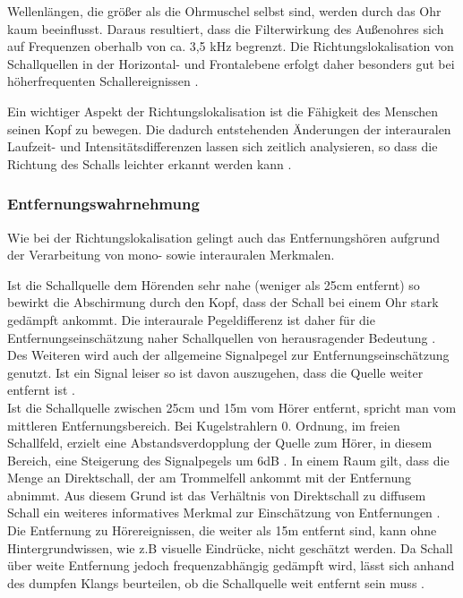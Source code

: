 Wellenlängen, die größer als die Ohrmuschel selbst sind, werden durch das Ohr kaum beeinflusst. Daraus resultiert, dass die Filterwirkung des Außenohres sich auf Frequenzen oberhalb von ca. 3,5 kHz begrenzt. Die Richtungslokalisation von Schallquellen in der Horizontal- und Frontalebene erfolgt daher besonders gut bei höherfrequenten Schallereignissen \cite[S.47]{Genuit10}.

Ein wichtiger Aspekt der Richtungslokalisation ist die Fähigkeit des Menschen seinen Kopf zu bewegen. Die dadurch entstehenden Änderungen der interauralen Laufzeit- und Intensitätsdifferenzen lassen sich zeitlich analysieren, so dass die Richtung des Schalls leichter erkannt werden kann \cite[S.88]{HdA08}.

\subsubsection{Entfernungswahrnehmung}

Wie bei der Richtungslokalisation gelingt auch das Entfernungshören aufgrund der Verarbeitung von mono- sowie interauralen Merkmalen.

Ist die Schallquelle dem Hörenden sehr nahe (weniger als 25cm entfernt) so bewirkt die Abschirmung durch den Kopf, dass der Schall bei einem Ohr stark gedämpft ankommt. Die interaurale Pegeldifferenz ist daher für die Entfernungseinschätzung naher Schallquellen von herausragender Bedeutung \cite[S.98]{HdA08}.\\

Des Weiteren wird auch der allgemeine Signalpegel zur Entfernungseinschätzung genutzt. Ist ein Signal leiser so ist davon auszugehen, dass die Quelle weiter entfernt ist \cite[S.98]{HdA08}.\\

Ist die Schallquelle zwischen 25cm und 15m vom Hörer entfernt, spricht man vom mittleren Entfernungsbereich. Bei Kugelstrahlern 0. Ordnung, im freien Schallfeld, erzielt eine Abstandsverdopplung der Quelle zum Hörer, in diesem Bereich, eine Steigerung des Signalpegels um 6dB \cite[S.98]{HdA08}. In einem Raum gilt, dass die Menge an Direktschall, der am Trommelfell ankommt mit der Entfernung abnimmt. Aus diesem Grund ist das Verhältnis von Direktschall zu diffusem Schall ein weiteres informatives Merkmal zur Einschätzung von Entfernungen \cite[S.57]{Heidermanns1979}.
\\

Die Entfernung zu Hörereignissen, die weiter als 15m entfernt sind, kann ohne Hintergrundwissen, wie z.B visuelle Eindrücke, nicht geschätzt werden. Da Schall über weite Entfernung jedoch frequenzabhängig gedämpft wird, lässt sich anhand des dumpfen Klangs beurteilen, ob die Schallquelle weit entfernt sein muss \cite[S.99]{HdA08}. 

